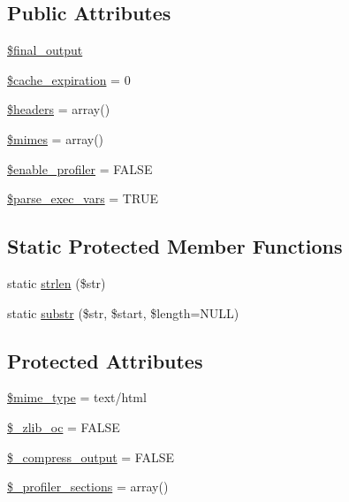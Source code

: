 \subsection*{Public Attributes}
\begin{DoxyCompactItemize}
\item 
\mbox{\hyperlink{class_c_i___output_aa1b5049c03b9ef373af010aa3cda17a3}{\$final\+\_\+output}}
\item 
\mbox{\hyperlink{class_c_i___output_a4a65b5005fdb96d5bdac5d642a022f16}{\$cache\+\_\+expiration}} = 0
\item 
\mbox{\hyperlink{class_c_i___output_a52500036ee807241b8b4b7e2367c49ef}{\$headers}} = array()
\item 
\mbox{\hyperlink{class_c_i___output_a2ce7d338d1fd0f0d971ba6213ac298a2}{\$mimes}} = array()
\item 
\mbox{\hyperlink{class_c_i___output_a85f3ab9485440090efd4e0ae9a070747}{\$enable\+\_\+profiler}} = F\+A\+L\+SE
\item 
\mbox{\hyperlink{class_c_i___output_a254d73d122352494697cdba0c509086d}{\$parse\+\_\+exec\+\_\+vars}} = T\+R\+UE
\end{DoxyCompactItemize}
\subsection*{Static Protected Member Functions}
\begin{DoxyCompactItemize}
\item 
static \mbox{\hyperlink{class_c_i___output_a4c29a687d4ed62c26a10e41d98930d5f}{strlen}} (\$str)
\item 
static \mbox{\hyperlink{class_c_i___output_a101caef57ef0b165da5747e2c2e6c9dc}{substr}} (\$str, \$start, \$length=N\+U\+LL)
\end{DoxyCompactItemize}
\subsection*{Protected Attributes}
\begin{DoxyCompactItemize}
\item 
\mbox{\hyperlink{class_c_i___output_a4d1985caafb49b059e3ca3dedfee257a}{\$mime\+\_\+type}} = \textquotesingle{}text/html\textquotesingle{}
\item 
\mbox{\hyperlink{class_c_i___output_a76d91b71069ec82a31b4d12643e0ca40}{\$\+\_\+zlib\+\_\+oc}} = F\+A\+L\+SE
\item 
\mbox{\hyperlink{class_c_i___output_a9b8f5f282f8cf7b10d1b03b219df1386}{\$\+\_\+compress\+\_\+output}} = F\+A\+L\+SE
\item 
\mbox{\hyperlink{class_c_i___output_a4d239124375bbbdb9a4f5a0260505c40}{\$\+\_\+profiler\+\_\+sections}} = array()
\end{DoxyCompactItemize}
